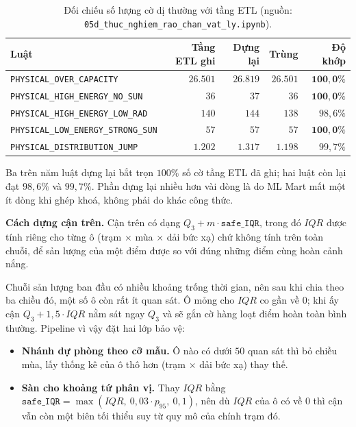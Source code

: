 \begin{table}[htbp]
\centering
\caption{Đối chiếu số lượng cờ dị thường với tầng ETL (nguồn: \texttt{05d\_thuc\_nghiem\_rao\_chan\_vat\_ly.ipynb}).}
\label{tab:tai_lap_luat}
\small
\begin{tabular}{l r r r r}
\toprule
\textbf{Luật} & \textbf{Tầng ETL ghi} & \textbf{Dựng lại} & \textbf{Trùng} & \textbf{Độ khớp} \\
\midrule
\texttt{PHYSICAL\_OVER\_CAPACITY}          & $26.501$ & $26.819$ & $26.501$ & $\mathbf{100{,}0\%}$ \\
\texttt{PHYSICAL\_HIGH\_ENERGY\_NO\_SUN}   & $36$     & $37$     & $36$     & $\mathbf{100{,}0\%}$ \\
\texttt{PHYSICAL\_HIGH\_ENERGY\_LOW\_RAD}  & $140$    & $144$    & $138$    & $98{,}6\%$ \\
\texttt{PHYSICAL\_LOW\_ENERGY\_STRONG\_SUN}& $57$     & $57$     & $57$     & $\mathbf{100{,}0\%}$ \\
\texttt{PHYSICAL\_DISTRIBUTION\_JUMP}      & $1.202$  & $1.317$  & $1.198$  & $99{,}7\%$ \\
\bottomrule
\end{tabular}
\end{table}

Ba trên năm luật dựng lại bắt trọn $100\%$ số cờ tầng ETL đã ghi; hai luật còn lại đạt
$98{,}6\%$ và $99{,}7\%$. Phần dựng lại nhiều hơn vài dòng là do ML Mart mất một ít dòng khi
ghép khoá, không phải do khác công thức.

\textbf{Cách dựng cận trên.} Cận trên có dạng $Q_3 + m \cdot \texttt{safe\_IQR}$, trong đó
$IQR$ được tính riêng cho từng ô (trạm $\times$ mùa $\times$ dải bức xạ) chứ không
tính trên toàn chuỗi, để sản lượng của một điểm được so với đúng những điểm cùng hoàn cảnh
nắng.

Chuỗi sản lượng ban đầu có nhiều khoảng trống thời gian, nên sau khi chia theo ba chiều đó,
một số ô còn rất ít quan sát. Ô mỏng cho $IQR$ co gần về $0$; khi ấy cận
$Q_3 + 1{,}5 \cdot IQR$ nằm sát ngay $Q_3$ và sẽ gắn cờ hàng loạt điểm hoàn toàn bình
thường. Pipeline vì vậy đặt hai lớp bảo vệ:

\begin{itemize}
    \item \textbf{Nhánh dự phòng theo cỡ mẫu.} Ô nào có dưới $50$ quan sát thì bỏ chiều mùa,
    lấy thống kê của ô thô hơn (trạm $\times$ dải bức xạ) thay thế.
    \item \textbf{Sàn cho khoảng tứ phân vị.} Thay $IQR$ bằng
    $\texttt{safe\_IQR} = \max(IQR,\ 0{,}03 \cdot p_{95},\ 0{,}1)$, nên dù $IQR$ của ô có về
    $0$ thì cận vẫn còn một biên tối thiểu suy từ quy mô của chính trạm đó.
\end{itemize}


